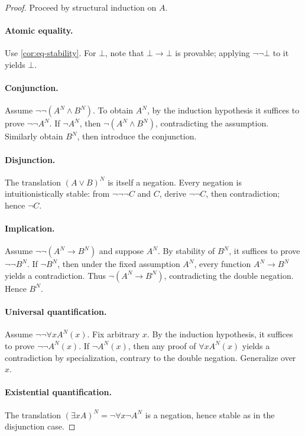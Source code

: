 \begin{proof}
Proceed by structural induction on \(A\).

\paragraph{Atomic equality.}
Use \cref{cor:eq-stability}.  For \(\bot\), note that \(\bot\to\bot\) is provable; applying \(\neg\neg\bot\) to it yields \(\bot\).

\paragraph{Conjunction.}
Assume \(\neg\neg(A^N\wedge B^N)\).  To obtain \(A^N\), by the induction hypothesis it suffices to prove \(\neg\neg A^N\).  If \(\neg A^N\), then \(\neg(A^N\wedge B^N)\), contradicting the assumption.  Similarly obtain \(B^N\), then introduce the conjunction.

\paragraph{Disjunction.}
The translation \((A\vee B)^N\) is itself a negation.  Every negation is intuitionistically stable: from \(\neg\neg\neg C\) and \(C\), derive \(\neg\neg C\), then contradiction; hence \(\neg C\).

\paragraph{Implication.}
Assume \(\neg\neg(A^N\to B^N)\) and suppose \(A^N\).  By stability of \(B^N\), it suffices to prove \(\neg\neg B^N\).  If \(\neg B^N\), then under the fixed assumption \(A^N\), every function \(A^N\to B^N\) yields a contradiction.  Thus \(\neg(A^N\to B^N)\), contradicting the double negation.  Hence \(B^N\).

\paragraph{Universal quantification.}
Assume \(\neg\neg\forall x A^N(x)\).  Fix arbitrary \(x\).  By the induction hypothesis, it suffices to prove \(\neg\neg A^N(x)\).  If \(\neg A^N(x)\), then any proof of \(\forall x A^N(x)\) yields a contradiction by specialization, contrary to the double negation.  Generalize over \(x\).

\paragraph{Existential quantification.}
The translation \((\exists x A)^N=\neg\forall x\neg A^N\) is a negation, hence stable as in the disjunction case.
\end{proof}

